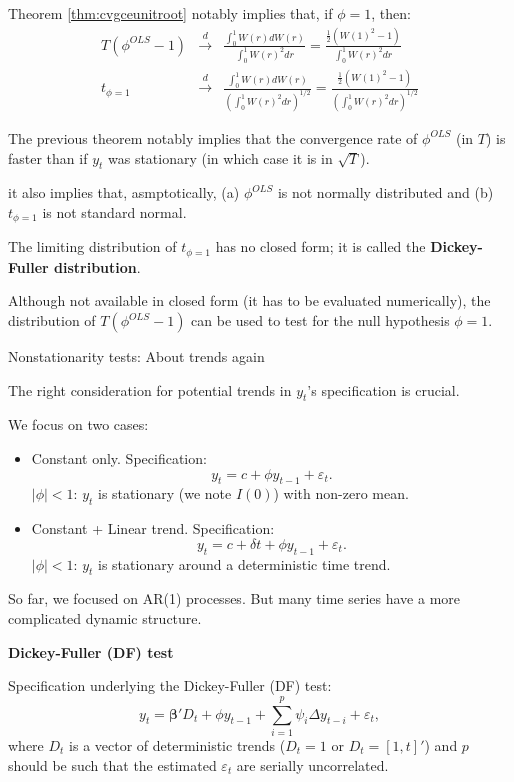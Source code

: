 \documentclass[
  12pt,
]{book}
\providecommand{\tightlist}{%
  \setlength{\itemsep}{0pt}\setlength{\parskip}{0pt}}
\theoremstyle{definition}
\theoremstyle{definition}
\theoremstyle{definition}
\theoremstyle{definition}
\theoremstyle{remark}
\begin{document}
Theorem \ref{thm:cvgceunitroot} notably implies that, if \(\phi=1\), then:
\begin{eqnarray}
T(\phi^{OLS}-1) &\overset{d}{\rightarrow}& \frac{\int_{0}^{1}W(r)dW(r)}{\int_{0}^{1}W(r)^2dr} = \frac{\frac{1}{2}(W(1)^2-1)}{\int_{0}^{1}W(r)^2dr}\label{eq:biasstat}\\
t_{\phi=1} &\overset{d}{\rightarrow}& \frac{\int_{0}^{1}W(r)dW(r)}{\left(\int_{0}^{1}W(r)^2dr\right)^{1/2}}= \frac{\frac{1}{2}(W(1)^2-1)}{\left(\int_{0}^{1}W(r)^2dr\right)^{1/2}}\label{eq:tstat}
\end{eqnarray}

The previous theorem notably implies that the convergence rate of \(\phi^{OLS}\) (in \(T\)) is faster than if \(y_t\) was stationary (in which case it is in \(\sqrt{T}\)).

it also implies that, asmptotically, (a) \(\phi^{OLS}\) is not normally distributed and (b) \(t_{\phi=1}\) is not standard normal.

The limiting distribution of \(t_{\phi=1}\) has no closed form; it is called the \textbf{Dickey-Fuller distribution}.

Although not available in closed form (it has to be evaluated numerically), the distribution of \(T(\phi^{OLS}-1)\) can be used to test for the null hypothesis \(\phi=1\).

Nonstationarity tests: About trends again

The right consideration for potential trends in \(y_t\)'s specification is crucial.

We focus on two cases:

\begin{itemize}
\tightlist
\item
  Constant only. Specification:
  \[
  y_t = c + \phi y_{t-1} + \varepsilon_t.
  \]
  \(|\phi|<1\): \(y_t\) is stationary (we note \(I(0)\)) with non-zero mean.
\item
  Constant + Linear trend. Specification:
  \[
  y_t = c + \delta t + \phi y_{t-1} + \varepsilon_t.
  \]
  \(|\phi|<1\): \(y_t\) is stationary around a deterministic time trend.
\end{itemize}

So far, we focused on AR(1) processes. But many time series have a more complicated dynamic structure.

\textbf{Dickey-Fuller (DF) test}

\citet{DF1979}

Specification underlying the Dickey-Fuller (DF) test:
\begin{equation}
y_t = \boldsymbol\beta'D_t + \phi y_{t-1} + \sum_{i=1}^{p}\psi_i \Delta y_{t-i} + \varepsilon_t,\label{eq:adf11}
\end{equation}
where \(D_t\) is a vector of deterministic trends (\(D_t = 1\) or \(D_t = [1,t]'\)) and \(p\) should be such that the estimated \(\varepsilon_t\) are serially uncorrelated.
\end{document}
